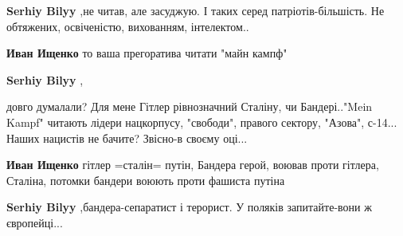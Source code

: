 \begin{itemize}
\begin{itemize}
 
\textbf{Serhiy Bilyy} ,не читав, але засуджую. І таких серед патріотів-більшість. Не обтяжених, освіченістю, вихованням, інтелектом..

 
\textbf{Иван Ищенко} то ваша прегоратива читати "майн кампф"

 
\textbf{Serhiy Bilyy} ,

довго думалали? Для мене Гітлер рівнозначний Сталіну, чи
Бандері.."Mein Kampf" читають лідери нацкорпусу, "свободи", правого
сектору, "Азова", с-14... Наших нацистів не бачите? Звісно-в своєму оці...


 
\textbf{Иван Ищенко} гітлер =сталін= путін, Бандера герой, воював проти гітлера, Сталіна, потомки бандери воюють проти фашиста путіна

 
\textbf{Serhiy Bilyy} ,бандера-сепаратист і терорист. У поляків запитайте-вони ж європейці...

 

\end{itemize}
\end{itemize}
